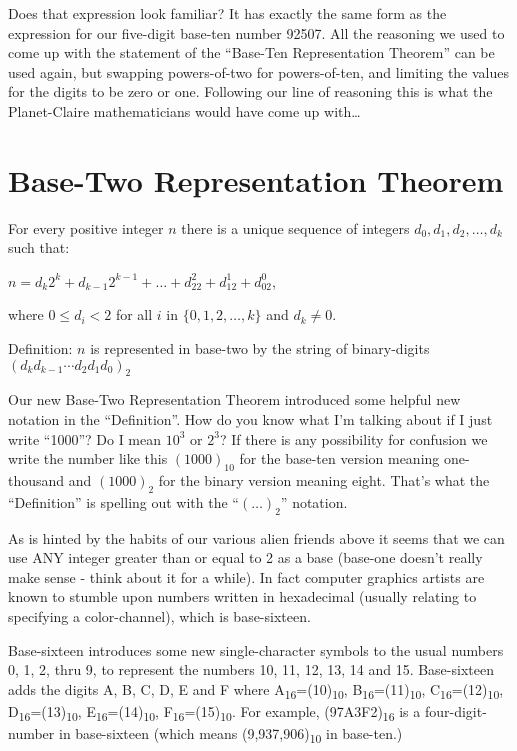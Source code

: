 \documentclass{article}
\newenvironment{jprIn}{\begin{adjustwidth}{2em}{}}{\end{adjustwidth}}
\begin{document}
Does that expression look familiar? It has exactly the same form
as the expression for our five-digit base-ten number 92507.
All the reasoning we used to come up with the statement of the ``Base-Ten
Representation Theorem'' can be used again, but swapping powers-of-two
for powers-of-ten, and limiting the values for the digits
to be zero or one.
Following our line of reasoning this is what the Planet-Claire mathematicians would have
come up with\dots

\break
\section*{Base-Two Representation Theorem}
\begin{jprIn}
For every positive integer $n$ there is a unique
sequence of integers $d_0, d_1, d_2,\dots{},d_k$ such that:

\hspace{3em}$n=d_k2^k+d_{k-1}2^{k-1}+\dots+d_22^2+d_12^1+d_02^0$,

where $0\le{}d_i<2$ for all $i$ in $\{0,1,2,\dots{},k\}$ and $d_k\ne0$.

Definition: $n$ is represented in base-two by the string
of binary-digits $(d_kd_{k-1}{\cdots}d_2d_1d_0)_2$
\end{jprIn}
\bigskip

Our new Base-Two Representation Theorem introduced some helpful new notation in the ``Definition''.
How do you know what I'm talking about if I just
write ``1000''? Do I mean $10^3$ or $2^3$?
If there is any possibility for confusion we write
the number like this $(1000)_{10}$ 
for the base-ten version meaning one-thousand and $(1000)_2$
for the binary version meaning eight.
That's what the ``Definition'' is spelling out with the ``$(\dots)_2$'' notation.

As is hinted by the habits of our various alien friends
above it seems that we can use ANY integer greater than
or equal to 2 as a base (base-one doesn't really make
sense - think about it for a while).
In fact computer graphics artists are known
to stumble upon numbers written in hexadecimal (usually relating to specifying a color-channel),
which is base-sixteen.

Base-sixteen introduces some new single-character symbols to the usual numbers 0, 1,
2, thru 9,
to represent the numbers 10, 11, 12, 13, 14 and 15.
Base-sixteen adds the digits A, B, C, D, E and F where
A\textsubscript{16}=(10)\textsubscript{10},
B\textsubscript{16}=(11)\textsubscript{10},
C\textsubscript{16}=(12)\textsubscript{10},
D\textsubscript{16}=(13)\textsubscript{10},
E\textsubscript{16}=(14)\textsubscript{10},
F\textsubscript{16}=(15)\textsubscript{10}.
For example, (97A3F2)\textsubscript{16} is a four-digit-number in base-sixteen
(which means (9,937,906)\textsubscript{10} in base-ten.)
\end{document}
